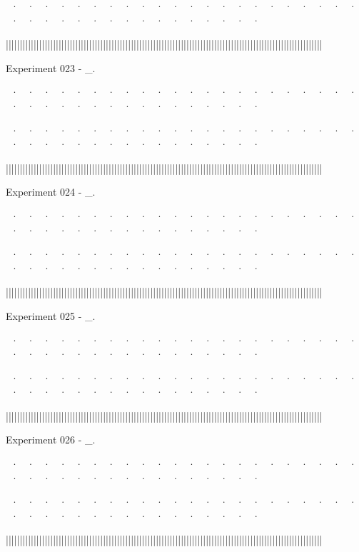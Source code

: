 ~· ~· ~· ~· ~· ~· ~· ~· ~· ~· ~· ~· ~· ~· ~· ~· ~· ~· ~· ~· ~· ~· ~· ~· ~· ~· ~· ~· ~· ~· ~· ~· ~· ~· ~· ~· ~· ~· 



||||||||||||||||||||||||||||||||||||||||||||||||||||||||||||||||||||||||||||||||||||||||||||||||||||||||||||||||||


Experiment 023 - _. 


~· ~· ~· ~· ~· ~· ~· ~· ~· ~· ~· ~· ~· ~· ~· ~· ~· ~· ~· ~· ~· ~· ~· ~· ~· ~· ~· ~· ~· ~· ~· ~· ~· ~· ~· ~· ~· ~· 

~· ~· ~· ~· ~· ~· ~· ~· ~· ~· ~· ~· ~· ~· ~· ~· ~· ~· ~· ~· ~· ~· ~· ~· ~· ~· ~· ~· ~· ~· ~· ~· ~· ~· ~· ~· ~· ~· 



||||||||||||||||||||||||||||||||||||||||||||||||||||||||||||||||||||||||||||||||||||||||||||||||||||||||||||||||||


Experiment 024 - _. 


~· ~· ~· ~· ~· ~· ~· ~· ~· ~· ~· ~· ~· ~· ~· ~· ~· ~· ~· ~· ~· ~· ~· ~· ~· ~· ~· ~· ~· ~· ~· ~· ~· ~· ~· ~· ~· ~· 

~· ~· ~· ~· ~· ~· ~· ~· ~· ~· ~· ~· ~· ~· ~· ~· ~· ~· ~· ~· ~· ~· ~· ~· ~· ~· ~· ~· ~· ~· ~· ~· ~· ~· ~· ~· ~· ~· 



||||||||||||||||||||||||||||||||||||||||||||||||||||||||||||||||||||||||||||||||||||||||||||||||||||||||||||||||||


Experiment 025 - _. 


~· ~· ~· ~· ~· ~· ~· ~· ~· ~· ~· ~· ~· ~· ~· ~· ~· ~· ~· ~· ~· ~· ~· ~· ~· ~· ~· ~· ~· ~· ~· ~· ~· ~· ~· ~· ~· ~· 

~· ~· ~· ~· ~· ~· ~· ~· ~· ~· ~· ~· ~· ~· ~· ~· ~· ~· ~· ~· ~· ~· ~· ~· ~· ~· ~· ~· ~· ~· ~· ~· ~· ~· ~· ~· ~· ~· 



||||||||||||||||||||||||||||||||||||||||||||||||||||||||||||||||||||||||||||||||||||||||||||||||||||||||||||||||||


Experiment 026 - _. 


~· ~· ~· ~· ~· ~· ~· ~· ~· ~· ~· ~· ~· ~· ~· ~· ~· ~· ~· ~· ~· ~· ~· ~· ~· ~· ~· ~· ~· ~· ~· ~· ~· ~· ~· ~· ~· ~· 

~· ~· ~· ~· ~· ~· ~· ~· ~· ~· ~· ~· ~· ~· ~· ~· ~· ~· ~· ~· ~· ~· ~· ~· ~· ~· ~· ~· ~· ~· ~· ~· ~· ~· ~· ~· ~· ~· 



||||||||||||||||||||||||||||||||||||||||||||||||||||||||||||||||||||||||||||||||||||||||||||||||||||||||||||||||||


